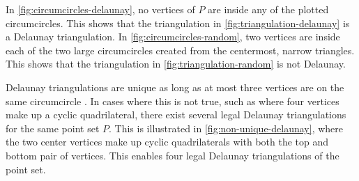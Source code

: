In \autoref{fig:circumcircles-delaunay}, no vertices of $P$ are inside any of the plotted circumcircles. This shows that the triangulation in \autoref{fig:triangulation-delaunay} is a Delaunay triangulation. In \autoref{fig:circumcircles-random}, two vertices are inside each of the two large circumcircles created from the centermost, narrow triangles. This shows that the triangulation in \autoref{fig:triangulation-random} is not Delaunay.

Delaunay triangulations are unique as long as at most three vertices are on the same circumcircle \cite[Theorem 2.1]{UPR_thesis}. In cases where this is not true, such as where four vertices make up a cyclic quadrilateral, there exist several legal Delaunay triangulations for the same point set $P$. This is illustrated in \autoref{fig:non-unique-delaunay}, where the two center vertices make up cyclic quadrilaterals with both the top and bottom pair of vertices. This enables four legal Delaunay triangulations of the point set.

